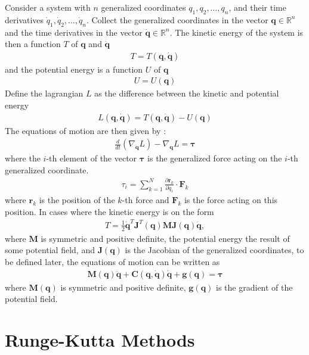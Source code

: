 Consider a system with $n$ generalized coordinates $q_1, q_2, \ldots, q_n$, and
their time derivatives $\dot{q}_1, \dot{q}_2, \ldots, \dot{q}_n$. Collect the
generalized coordinates in the vector $\bm{q} \in \mathbb{R}^n$ and the time
derivatives in the vector $\bm{\dot{q}} \in \mathbb{R}^n$. The kinetic energy
of the system is then a function $T$ of $\bm{q}$ and $\bm{\dot{q}}$
\begin{align}
    T = T(\bm{q}, \bm{\dot{q}})
\end{align}
and the potential energy is a function $U$ of $\bm{q}$
\begin{align}
    U = U(\bm{q})
\end{align}
Define the lagrangian $L$ as the difference between the kinetic and potential
energy
\begin{align}
    L(\bm{q}, \bm{\dot{q}}) = T(\bm{q}, \bm{\dot{q}}) - U(\bm{q})
\end{align}
The equations of motion are then given by \cite{modsim}:
\begin{align}
    \frac{d}{dt} \left( \nabla_{\dot{\bm{q}}} L \right) - \nabla_{\bm{q}} L = \bm{\tau}
\end{align}
where the $i$-th element of the vector $\bm{\tau}$ is the generalized force acting
on the $i$-th generalized coordinate.
\begin{align}
    \tau_i = \sum_{k=1}^N \frac{\partial \bm{r}_k}{\partial q_i} \cdot \bm{F}_k
\end{align}
where $\bm{r}_k$ is the position of the $k$-th force and $\bm{F}_k$ is the force
acting on this position. In cases where the kinetic energy is on the form
\begin{align}
    T = \frac{1}{2} \bm{\dot{q}}^T \bm{J}^T(\bm{q}) \bm{M} \bm{J}(\bm{q}) \bm{\dot{q}},
\end{align}
where $\bm{M}$ is symmetric and positive definite, the potential energy the
result of some potential field, and $\bm{J}(\bm{q})$ is the Jacobian of the
generalized coordinates, to be defined later, the equations of motion can be
written as
\begin{align}
    \bm{M}(\bm{q}) \ddot{\bm{q}} + \bm{C}(\bm{q}, \dot{\bm{q}}) \dot{\bm{q}} + \bm{g}(\bm{q}) = \bm{\tau}
\end{align}
where $\bm{M}(\bm{q})$ is symmetric and positive definite, $\bm{g}(\bm{q})$ is the
gradient of the potential field.

\section{Runge-Kutta Methods}
\label{sec:runge-kutta}

